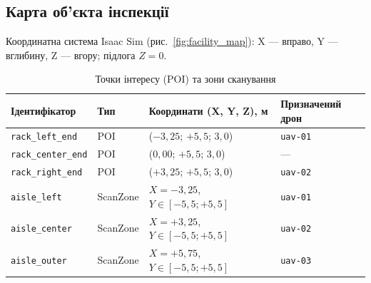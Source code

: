 \subsection{Карта об'єкта інспекції}

Координатна система Isaac Sim (рис.~\ref{fig:facility_map}): X — вправо, Y — вглибину, Z — вгору; підлога $Z=0$.

\begin{table}[h]
  \centering
  \caption{Точки інтересу (POI) та зони сканування}
  \begin{tabularx}{\linewidth}{lllX}
    \toprule
    Ідентифікатор & Тип & Координати (X, Y, Z), м & Призначений дрон \\
    \midrule
    \texttt{rack\_left\_end}   & POI      & ($-3{,}25$; $+5{,}5$; $3{,}0$)  & \texttt{uav-01} \\
    \texttt{rack\_center\_end} & POI      & ($0{,}00$; $+5{,}5$; $3{,}0$)   & — \\
    \texttt{rack\_right\_end}  & POI      & ($+3{,}25$; $+5{,}5$; $3{,}0$)  & \texttt{uav-02} \\
    \texttt{aisle\_left}   & ScanZone & $X=-3{,}25$, $Y\in[-5{,}5;+5{,}5]$ & \texttt{uav-01} \\
    \texttt{aisle\_center} & ScanZone & $X=+3{,}25$, $Y\in[-5{,}5;+5{,}5]$ & \texttt{uav-02} \\
    \texttt{aisle\_outer}  & ScanZone & $X=+5{,}75$, $Y\in[-5{,}5;+5{,}5]$ & \texttt{uav-03} \\
    \bottomrule
  \end{tabularx}
  \label{tab:facility}
\end{table}
